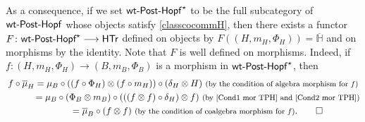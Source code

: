 \documentclass[pdftex]{sigma}
\numberwithin{equation}{section}
\begin{document}
As a consequence, if we set ${\sf wt}\textnormal{-}{\sf Post}\textnormal{-}{\sf Hopf}^{\star}$ to be the full subcategory of ${\sf wt}\textnormal{-}{\sf Post}\textnormal{-}{\sf Hopf}$ whose objects satisfy \eqref{classcocommH}, then there exists a functor $F\colon \textnormal{{\sf wt}-{\sf Post}-{\sf Hopf}}^{\star}\longrightarrow \sf{HTr}$ defined on objects by $F((H,m_{H},\Phi_{H}))=\overline{\mathbb{H}}$ and on morphisms by the identity. Note that $F$ is well defined on morphisms. Indeed, if $f\colon (H,m_{H},\Phi_{H})\rightarrow (B,m_{B},\Phi_{B})$ is a morphism in ${\sf wt}\textnormal{-}{\sf Post}\textnormal{-}{\sf Hopf}^{\star}$, then
\begin{gather*}
 f\circ\overline{\mu}_{H}= \mu_{B}\circ((f\circ\Phi_{H})\otimes(f\circ m_{H}))\circ(\delta_{H}\otimes H)\ \text{\footnotesize\textnormal{(by the condition of algebra morphism for $f$)}}\\
 \hphantom{f\circ\overline{\mu}_{H}}{}= \mu_{B}\circ(\Phi_{B}\otimes m_{B})\circ(((f\otimes f)\circ\delta_{H})\otimes f)\ \text{\footnotesize\textnormal{(by \eqref{Cond1 mor TPH} and \eqref{Cond2 mor TPH})}}\\
 \hphantom{f\circ\overline{\mu}_{H}}{}= \overline{\mu}_{B}\circ(f\otimes f)\ \text{\footnotesize\textnormal{(by the condition of coalgebra morphism for $f$)}}.\qedhere
\end{gather*}
\end{document}
